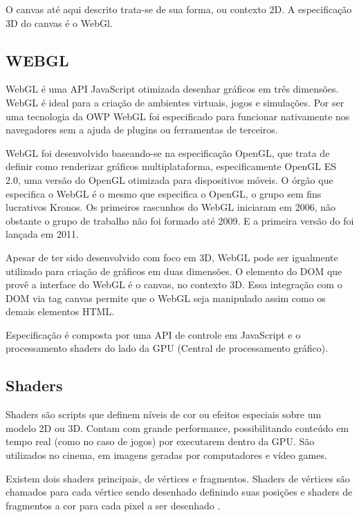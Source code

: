O canvas até aqui descrito trata-se de sua forma, ou contexto 2D. A
especificação 3D do canvas é o WebGl.

\subsection{WEBGL}
\begin{draft}

WebGL é uma API JavaScript otimizada desenhar gráficos em três dimensões.
WebGL é ideal para a criação de ambientes virtuais, jogos e simulações.
Por ser uma tecnologia da OWP WebGL foi especificado para funcionar
nativamente nos navegadores sem a ajuda de plugins ou ferramentas de terceiros.

WebGL foi desenvolvido baseando-se na especificação OpenGL, que trata
de definir como renderizar gráficos multiplataforma, especificamente
OpenGL ES 2.0, uma versão do OpenGL otimizada para dispositivos
móveis. O órgão que especifica o WebGL é o mesmo que especifica o
OpenGL, o grupo sem fins lucrativos Kronos. Os primeiros rascunhos do
WebGL iniciaram em 2006, não obstante o grupo de trabalho não foi
formado até 2009. E a primeira versão do foi lançada em 2011.

Apesar de ter sido desenvolvido com foco em 3D, WebGL pode ser
igualmente utilizado para criação de gráficos em duas
dimensões\autocite[pp. 6]{3daps}. O elemento do DOM que provê a
interface do WebGL é o canvas, no contexto 3D. Essa integração com
o DOM via tag canvas permite que o WebGL seja manipulado assim como os
demais elementos HTML.

Especificação é composta por uma API de controle em JavaScript e o
processamento shaders do lado da GPU (Central de processamento gráfico).

\subsection{Shaders}

Shaders são scripts que definem níveis de cor ou efeitos especiais
sobre um modelo 2D ou 3D. Contam com grande performance, possibilitando
conteúdo em tempo real (como no caso de jogos) por executarem dentro
da GPU. São utilizados no cinema, em imagens geradas por computadores e
vídeo games.

Existem dois shaders principais, de vértices e fragmentos.
Shaders de vértices são chamados para cada vértice sendo desenhado
definindo suas posições e shaders de fragmentos a cor para cada pixel
a ser desenhado \autocite[pp.15]{3daps}.


\end{draft}
